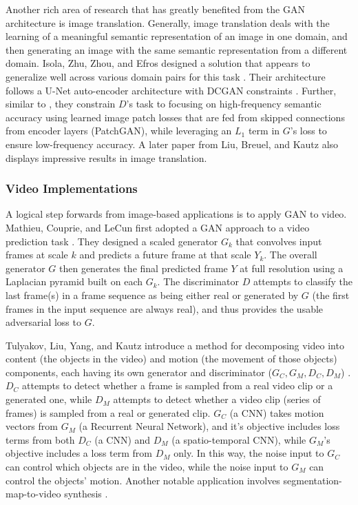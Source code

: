 \documentclass[11pt]{article}
\begin{document}
Another rich area of research that has greatly benefited from the GAN architecture is image translation.  Generally, image translation deals with the learning of a meaningful semantic representation of an image in one domain, and then generating an image with the same semantic representation from a different domain.  Isola, Zhu, Zhou, and Efros designed a solution that appears to generalize well across various domain pairs for this task \cite{isola2017image}.  Their architecture follows a U-Net auto-encoder architecture \cite{ronneberger2015u} with DCGAN constraints \cite{salimans2016improved}.  Further, similar to \cite{pathakCVPR16context}, they constrain $D$'s task to focusing on high-frequency semantic accuracy using learned image patch losses that are fed from skipped connections from encoder layers (PatchGAN), while leveraging an $L_1$ term in $G$'s loss to ensure low-frequency accuracy.  A later paper from Liu, Breuel, and Kautz also displays impressive results \cite{NIPS2017_6672} in image translation.

\subsubsection{Video Implementations}

A logical step forwards from image-based applications is to apply GAN to video.  Mathieu, Couprie, and LeCun first adopted a GAN approach to a video prediction task \cite{Mathieu2015DeepMV}.  They designed a scaled generator $G_k$ that convolves input frames at scale $k$ and predicts a future frame at that scale $Y_k$.  The overall generator $G$ then generates the final predicted frame $Y$ at full resolution using a Laplacian pyramid \cite{denton2015deep} built on each $G_k$.  The discriminator $D$ attempts to classify the last frame(s) in a frame sequence as being either real or generated by $G$ (the first frames in the input sequence are always real), and thus provides the usable adversarial loss to $G$.

Tulyakov, Liu, Yang, and Kautz introduce a method for decomposing video into content (the objects in the video) and motion (the movement of those objects) components, each having its own generator and discriminator ($G_C, G_M, D_C, D_M$) \cite{tulyakov2017mocogan}.  $D_C$ attempts to detect whether a frame is sampled from a real video clip or a generated one, while $D_M$ attempts to detect whether a video clip (series of frames) is sampled from a real or generated clip.  $G_C$ (a CNN) takes motion vectors from $G_M$ (a Recurrent Neural Network), and it's objective includes loss terms from both $D_C$ (a CNN) and $D_M$ (a spatio-temporal CNN), while $G_M$'s objective includes a loss term from $D_M$ only.  In this way, the noise input to $G_C$ can control which objects are in the video, while the noise input to $G_M$ can control the objects' motion.  Another notable application involves segmentation-map-to-video synthesis \cite{wang2018videotovideo}.
\end{document}
